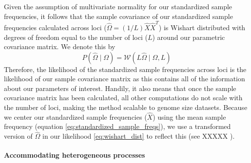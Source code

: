 \documentclass[12pt]{article}
\newcommand{\plrm}[1]{\todo[color=green!20]{#1}}
\newcommand{\plrm}[1]{\plr{#1}}
\newcommand{\plr}[1]{{\it\color{green}{(#1)}}}
\begin{document}
Given the assumption of multivariate normality for our standardized sample frequencies, it follows that the sample covariance of our standardized sample frequencies calculated across loci ($ \widehat{\Omega} = (1/L)  \hat{X}\hat{X}^T$) is Wishart distributed with degrees of freedom equal to the number of loci ($L$) around our parametric covariance matrix. We denote this by
\begin{equation}
\label{eq:wishart_dist}
P(\widehat{\Omega} \mid \Omega) = \mathcal{W}\left( L\widehat{\Omega} \mid \Omega,L \right)
\end{equation}
Therefore, the likelihood of the standardized sample frequencies across loci is the likelihood of our sample covariance matrix as this contains all of the information about our parameters of interest.  Handily, it also means that once the sample covariance matrix has been calculated, all other computations do not scale with the number of loci, making the method scalable to genome size datasets. Because we center our standardized sample frequencies ($\hat{X}$) using the mean sample frequency (equation \eqref{eq:standardized_sample_freqs}), we use a transformed version of $\widehat{\Omega} $ in our likelihood \eqref{eq:wishart_dist} to reflect this (see XXXXX ).





\paragraph{Accommodating heterogeneous processes}
\end{document}
